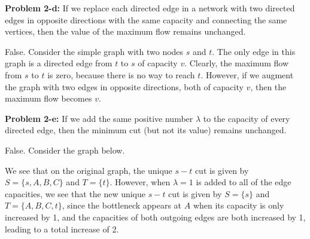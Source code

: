 \documentclass[psamsfonts]{amsart}
\newenvironment{sol}{\vspace{0.25cm}{\large \bfseries Solution:}}{\qedsymbol}
\newenvironment{prob}[1]{\begin{framed}{\large \bfseries Problem #1:}}{\end{framed}}
\begin{document}
\begin{prob}{2-d}
If we replace each directed edge in a network with two directed edges in opposite directions with the same capacity and connecting the same vertices, then the value of the maximum flow remains unchanged.
\end{prob}

\begin{sol}
False. Consider the simple graph with two nodes $s$ and $t$. The only edge in this graph is a directed edge from $t$ to $s$ of capacity $v$. Clearly, the maximum flow from $s$ to $t$ is zero, because there is no way to reach $t$. However, if we augment the graph with two edges in opposite directions, both of capacity $v$, then the maximum flow becomes $v$.
\end{sol}

\begin{prob}{2-e}
If we add the same positive number $\lambda$ to the capacity of every directed edge, then the minimum cut (but not its value) remains unchanged.
\end{prob}

\begin{sol}
False. Consider the graph below. 
\begin{figure}[h!]
\centering
{}
\end{figure}

We see that on the original graph, the unique $s-t$ cut is given by $S = \{s, A, B, C\}$ and $T = \{t\}$. However, when $\lambda = 1$ is added to all of the edge capacities, we see that the new unique $s-t$ cut is given by $S = \{s\}$ and $T = \{A, B, C, t \}$, since the bottleneck appears at $A$ when its capacity is only increased by 1, and the capacities of both outgoing edges are both increased by 1, leading to a total increase of 2. 
\end{sol}
\end{document}
